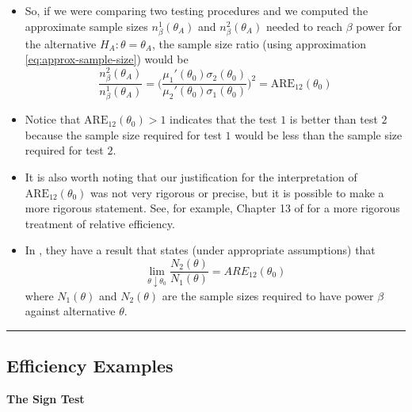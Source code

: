 \documentclass[]{book}
\begin{document}
\begin{itemize}
\begin{equation}
  \label{eq:approx-sample-size}
  \end{equation}
\item
  So, if we were comparing two testing procedures and we computed the approximate sample sizes \(n_{\beta}^{1}(\theta_{A})\) and \(n_{\beta}^{2}(\theta_{A})\) needed to reach \(\beta\) power for the alternative \(H_{A}: \theta = \theta_{A}\), the sample
  size ratio (using approximation \eqref{eq:approx-sample-size}) would be
  \begin{equation}
  \frac{ n_{\beta}^{2}(\theta_{A}) }{n_{\beta}^{1}(\theta_{A}) }
  = \Bigg( \frac{ \mu_{1}'(\theta_{0})\sigma_{2}(\theta_{0}) }{ \mu_{2}'(\theta_{0})\sigma_{1}(\theta_{0})} \Bigg)^{2}
  = \textrm{ARE}_{12}(\theta_{0}) 
  \end{equation}
\item
  Notice that \(\textrm{ARE}_{12}(\theta_{0}) > 1\) indicates that the test \(1\) is better than test \(2\)
  because the sample size required for test \(1\) would be less than the sample size required for test \(2\).
\item
  It is also worth noting that our justification for the interpretation of \(\textrm{ARE}_{12}(\theta_{0})\)
  was not very rigorous or precise, but it is possible to make a more rigorous statement.
  See, for example, Chapter 13 of \citet{lehmann2006} for a more rigorous treatment of relative efficiency.
\item
  In \citet{lehmann2006}, they have a result that states (under appropriate assumptions) that
  \begin{equation}
  \lim_{\theta \downarrow \theta_{0}} \frac{N_{2}(\theta)}{N_{1}(\theta)} 
  = ARE_{12}(\theta_{0})
  \end{equation}
  where \(N_{1}(\theta)\) and \(N_{2}(\theta)\) are the sample
  sizes required to have power \(\beta\) against alternative \(\theta\).
\end{itemize}

\begin{center}\rule{0.5\linewidth}{\linethickness}\end{center}

\hypertarget{efficiency-examples}{%
\subsection{Efficiency Examples}\label{efficiency-examples}}

\textbf{The Sign Test}
\end{document}

